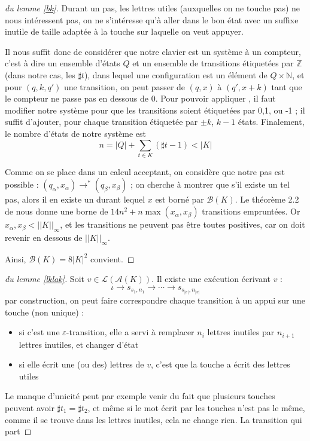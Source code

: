 \documentclass[12pt, a4paper]{article}
\renewcommand{\L}{\mathcal{L}}
\newcommand{\A}{\mathcal{A}}
\newcommand{\Kinf}{||K||_{\infty}}
\begin{document}
    \begin{proof}[du lemme \ref{bk}]
        
        Durant un pas, les lettres utiles (auxquelles on ne touche pas) ne nous intéressent pas, on ne s'intéresse qu'à aller dans le bon état avec un suffixe inutile de taille adaptée à la touche sur laquelle on veut appuyer.
        
        Il nous suffit donc de considérer que notre clavier est un système à un compteur, c'est à dire un ensemble d'états $Q$ et un ensemble de transitions étiquetées par $\mathbb{Z}$ (dans notre cas, les $\sharp t$), dans lequel une configuration est un élément de $Q \times \mathbb{N}$, et pour $(q,k,q')$ une transition, on peut passer de $(q,x)$ à $(q',x+k)$ tant que le compteur ne passe pas en dessous de 0.
        Pour pouvoir appliquer \cite{shortpathOCS}, il faut modifier notre système pour que les transitions soient étiquetées par 0,1, ou -1 ; il suffit d'ajouter, pour chaque transition étiquetée par $\pm k$, $k-1$ états.
        Finalement, le nombre d'états de notre système est 
        \[n = |Q| + \sum_{t \in K} (\sharp t - 1) < |K|\] 

        Comme on se place dans un calcul acceptant, on considère que notre pas est possible : $(q_\alpha,x_\alpha) \rightarrow^* (q_\beta,x_\beta)$ ; on cherche à montrer que s'il existe un tel pas, alors il en existe un durant lequel $x$ est borné par $\mathcal{B}(K)$.
        Le théorème 2.2 de \cite{shortpathOCS} nous donne une borne de $14n^2 + n \max (x_\alpha,x_\beta)$ transitions empruntées. Or $x_\alpha,x_\beta < \Kinf$, et les transitions ne peuvent pas être toutes positives, car on doit revenir en dessous de $\Kinf$.
        
        Ainsi, $\mathcal{B}(K) = 8|K|^2$ convient.
    \end{proof}
    \begin{proof}[du lemme \ref{lklak}]
       Soit $v \in \L(\A(K))$. Il existe une exécution écrivant $v$ :
       \[ \iota \rightarrow s_{s_1,n_1} \rightarrow \cdots \rightarrow s_{s_{|v|},n_|v|} \]
       par construction, on peut faire correspondre chaque transition à un appui sur une touche (non unique) :
       \begin{itemize}
        \item si c'est une $\varepsilon$-transition, elle a servi à remplacer $n_i$ lettres inutiles par $n_{i+1}$ lettres inutiles, et changer d'état
        \item si elle écrit une (ou des) lettres de $v$, c'est que la touche a écrit des lettres utiles
       \end{itemize}
       Le manque d'unicité peut par exemple venir du fait que plusieurs touches peuvent avoir $\sharp t_1 = \sharp t_2$, et même si le mot écrit par les touches n'est pas le même, comme il se trouve dans les lettres inutiles, cela ne change rien.
       La transition qui part 
    \end{proof}

    \clearpage
    \printbibliography
\end{document}

